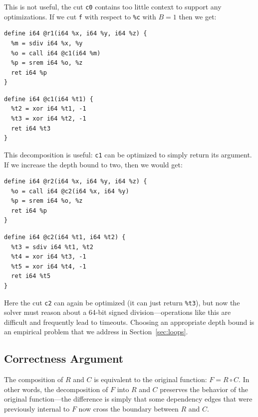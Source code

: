 This is not useful, the cut \texttt{c0} contains too little context
to support any optimizations.
%
If we cut \texttt{f} with respect to \texttt{\%c} with $B = 1$ then we get:

{\begin{quoting}
\begin{Verbatim}
define i64 @r1(i64 %x, i64 %y, i64 %z) {
  %m = sdiv i64 %x, %y
  %o = call i64 @c1(i64 %m)
  %p = srem i64 %o, %z
  ret i64 %p
}
\end{Verbatim}
\end{quoting}}

{\begin{quoting}
\begin{Verbatim}
define i64 @c1(i64 %t1) {
  %t2 = xor i64 %t1, -1
  %t3 = xor i64 %t2, -1
  ret i64 %t3
}
\end{Verbatim}
\end{quoting}}


This decomposition is useful: \texttt{c1} can be optimized to simply
return its argument.
%
If we increase the depth bound to two, then we would get:


{\begin{quoting}
\begin{Verbatim}
define i64 @r2(i64 %x, i64 %y, i64 %z) {
  %o = call i64 @c2(i64 %x, i64 %y)
  %p = srem i64 %o, %z
  ret i64 %p
}
\end{Verbatim}
\end{quoting}}
{\begin{quoting}
\begin{Verbatim}
define i64 @c2(i64 %t1, i64 %t2) {
  %t3 = sdiv i64 %t1, %t2
  %t4 = xor i64 %t3, -1
  %t5 = xor i64 %t4, -1
  ret i64 %t5
}
\end{Verbatim}
\end{quoting}}




Here the cut \texttt{c2} can again be optimized (it can just return
\texttt{\%t3}), but now the solver must reason about a 64-bit signed
division---operations like this are difficult and frequently lead to
timeouts.
%
Choosing an appropriate depth bound is an empirical problem that
we address in Section~\ref{sec:loops}.


\subsection{Correctness Argument}

The composition of $R$ and $C$ is equivalent to the original function:
$F = R \circ C$.
%
In other words, the decomposition of $F$ into $R$ and $C$ preserves
the behavior of the original function---the difference is simply that
some dependency edges that were previously internal to $F$ now cross
the boundary between $R$ and $C$.



